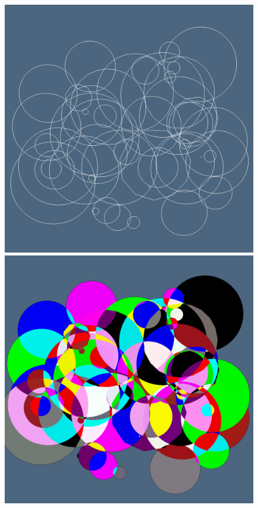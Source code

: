 \documentclass{juliacon}
\begin{document}
\begin{figure}[htbp] %
   \centering
   \includegraphics[width=0.5\linewidth]{figs/bubble1.png}%
   \includegraphics[width=0.5\linewidth]{figs/bubble2.png}%
   

\end{figure}
\end{document}
